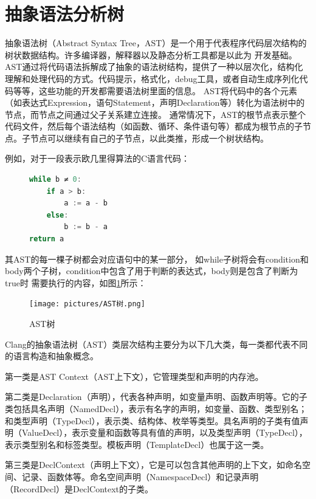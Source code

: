 \section{抽象语法分析树}
抽象语法树（Abstract Syntax Tree，AST）是一个用于代表程序代码层次结构的树状数据结构。许多编译器，解释器以及静态分析工具都是以此为
开发基础。AST通过将代码语法拆解成了抽象的语法树结构，提供了一种以层次化，结构化理解和处理代码的方式。代码提示，格式化，debug工具，或者自动生成序列化代码等等，这些功能的开发都需要语法树里面的信息。
AST将代码中的各个元素（如表达式Expression，语句Statement，声明Declaration等）转化为语法树中的节点，而节点之间通过父子关系建立连接。
通常情况下，AST的根节点表示整个代码文件，然后每个语法结构（如函数、循环、条件语句等）都成为根节点的子节点。子节点可以继续有自己的子节点，以此类推，形成一个树状结构。

例如，对于一段表示欧几里得算法的C语言代码：\\
\begin{figure}[htbp]
    \centering
\begin{minipage}{4cm}
\begin{lstlisting}[language=c++]
while b ≠ 0:
    if a > b:
        a := a - b
    else:
        b := b - a
return a
\end{lstlisting}
\end{minipage}

\end{figure}


其AST的每一棵子树都会对应语句中的某一部分，
如while子树将会有condition和body两个子树，condition中包含了用于判断的表达式，body则是包含了判断为true时
需要执行的内容，如图\ref{fig:AST树}所示：
\begin{figure}[htbp]
	\centering
	\texttt{[image: pictures/AST树.png]}
	\caption{AST树}
	\label{fig:AST树}
\end{figure}


Clang的抽象语法树（AST）类层次结构主要分为以下几大类，每一类都代表不同的语言构造和抽象概念。

第一类是AST Context（AST上下文），它管理类型和声明的内存池。

第二类是Declaration（声明），代表各种声明，如变量声明、函数声明等。它的子类包括具名声明（NamedDecl），表示有名字的声明，如变量、函数、类型别名；和类型声明（TypeDecl），表示类、结构体、枚举等类型。具名声明的子类有值声明（ValueDecl），表示变量和函数等具有值的声明，以及类型声明（TypeDecl），表示类型别名和标签类型。模板声明（TemplateDecl）也属于这一类。

第三类是DeclContext（声明上下文），它是可以包含其他声明的上下文，如命名空间、记录、函数体等。命名空间声明（NamespaceDecl）和记录声明（RecordDecl）是DeclContext的子类。

